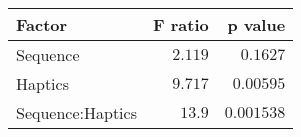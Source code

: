 \begin{tabular}{lrr}
\toprule
           Factor &  F ratio &    p value \\
\midrule
         Sequence &  $2.119$ &   $0.1627$ \\
          Haptics &  $9.717$ &  $0.00595$ \\
 Sequence:Haptics &   $13.9$ & $0.001538$ \\
\bottomrule
\end{tabular}
